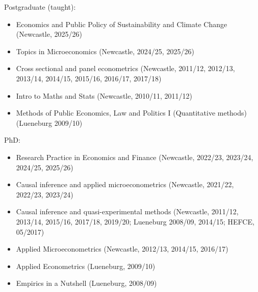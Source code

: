 \documentclass[10pt,pdftex,a4paper,oneside]{article}
\begin{document}
Postgraduate (taught): 
\begin{itemize}[noitemsep,nolistsep]
	\item Economics and Public Policy of Sustainability and Climate Change (Newcastle, 2025/26)
	\item Topics in Microeconomics (Newcastle, 2024/25, 2025/26)
	\item Cross sectional and panel econometrics (Newcastle, 2011/12, 2012/13, 2013/14, 2014/15, 2015/16, 2016/17, 2017/18)
	\item Intro to Maths and Stats (Newcastle, 2010/11, 2011/12)
	\item Methods of Public Economics, Law and Politics I (Quantitative methods) (Lueneburg 2009/10) 
\end{itemize}

PhD:
\begin{itemize}[noitemsep,nolistsep]
	\item Research Practice in Economics and Finance (Newcastle, 2022/23, 2023/24, 2024/25, 2025/26)
	\item Causal inference and applied microeconometrics (Newcastle, 2021/22, 2022/23, 2023/24)
	\item Causal inference and quasi-experimental methods (Newcastle, 2011/12, 2013/14, 2015/16, 2017/18, 2019/20; Lueneburg 2008/09, 2014/15; HEFCE, 05/2017)
	\item Applied Microeconometrics (Newcastle, 2012/13, 2014/15, 2016/17)
	\item Applied Econometrics (Lueneburg,  2009/10)
	\item Empirics in a Nutshell (Lueneburg, 2008/09)
\end{itemize}
\end{document}
